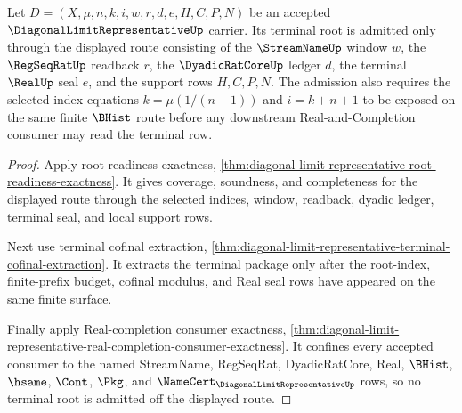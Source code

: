 \begin{theorem}
\label{thm:diagonal-limit-representative-terminal-root-admission}
Let $D=(X,\mu,n,k,i,w,r,d,e,H,C,P,N)$ be an accepted $\DiagonalLimitRepresentativeUp$ carrier. Its terminal root is admitted only through the displayed route consisting of the $\StreamNameUp$ window $w$, the $\RegSeqRatUp$ readback $r$, the $\DyadicRatCoreUp$ ledger $d$, the terminal $\RealUp$ seal $e$, and the support rows $H,C,P,N$. The admission also requires the selected-index equations $k=\mu(1/(n+1))$ and $i=k+n+1$ to be exposed on the same finite $\BHist$ route before any downstream Real-and-Completion consumer may read the terminal row.
\end{theorem}
\begin{proof}
Apply root-readiness exactness, \autoref{thm:diagonal-limit-representative-root-readiness-exactness}. It gives coverage, soundness, and completeness for the displayed route through the selected indices, window, readback, dyadic ledger, terminal seal, and local support rows.

Next use terminal cofinal extraction, \autoref{thm:diagonal-limit-representative-terminal-cofinal-extraction}. It extracts the terminal package only after the root-index, finite-prefix budget, cofinal modulus, and Real seal rows have appeared on the same finite surface.

Finally apply Real-completion consumer exactness, \autoref{thm:diagonal-limit-representative-real-completion-consumer-exactness}. It confines every accepted consumer to the named StreamName, RegSeqRat, DyadicRatCore, Real, $\BHist$, $\hsame$, $\Cont$, $\Pkg$, and $\NameCert_{\DiagonalLimitRepresentativeUp}$ rows, so no terminal root is admitted off the displayed route.
\end{proof}

